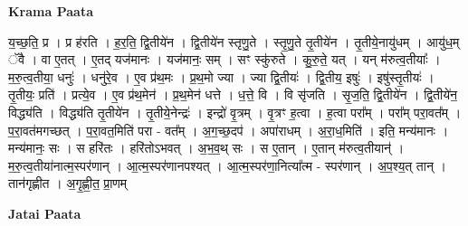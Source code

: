 \documentclass[17pt]{extarticle}
\begin{document}
\textbf{Krama Paata} \newline

य॒च्छ॒ति॒ प्र । प्र ह॑रति । ह॒र॒ति॒ द्वि॒तीये॑न । द्वि॒तीये॑न स्तृणु॒ते । स्तृ॒णु॒ते तृ॒तीये॑न । तृ॒तीये॒नायु॑धम् । आयु॑ध॒म् ॅवै । वा ए॒तत् । ए॒तद् यज॑मानः । यज॑मानः॒ सम् । सꣳ स्कु॑रुते । कु॒रु॒ते॒ यत् । यन् म॑रुत्व॒तीयाः᳚ । म॒रु॒त्व॒तीया॒ धनुः॑ । धनु॑रे॒व । ए॒व प्र॑थ॒मः । प्र॒थ॒मो ज्या । ज्या द्वि॒तीयः॑ । द्वि॒तीय॒ इषुः॑ । इषु॑स्तृ॒तीयः॑ । तृ॒तीयः॒ प्रति॑ । प्रत्ये॒व । ए॒व प्र॑थ॒मेन॑ । प्र॒थ॒मेन॑ धत्ते । ध॒त्ते॒ वि । वि सृ॑जति । सृ॒ज॒ति॒ द्वि॒तीये॑न । द्वि॒तीये॑न॒ विद्ध्य॑ति । विद्ध्य॑ति तृ॒तीये॑न । तृ॒तीये॒नेन्द्रः॑ । इन्द्रो॑ वृ॒त्रम् । वृ॒त्रꣳ ह॒त्वा । ह॒त्वा परा᳚म् । परा᳚म् परा॒वत᳚म् । प॒रा॒वत॑मगच्छत् । प॒रा॒वत॒मिति॑ परा - वत᳚म् । अ॒ग॒च्छ॒दप॑ । अपा॑राधम् । अ॒रा॒ध॒मिति॑ । इति॒ मन्य॑मानः । मन्य॑मानः॒ सः । स हरि॑तः । हरि॑तोऽभवत् । अ॒भ॒व॒थ् सः । स ए॒तान् । ए॒तान् म॑रुत्व॒तीयान्॑ । म॒रु॒त्व॒तीया॑नात्म॒स्पर॑णान् । आ॒त्म॒स्पर॑णानपश्यत् । आ॒त्म॒स्पर॑णा॒नित्या᳚त्म - स्पर॑णान् । अ॒प॒श्य॒त् तान् । तान॑गृह्णीत । अ॒गृ॒ह्णी॒त॒ प्रा॒णम् \newline

\textbf{Jatai Paata} \newline
\end{document}
